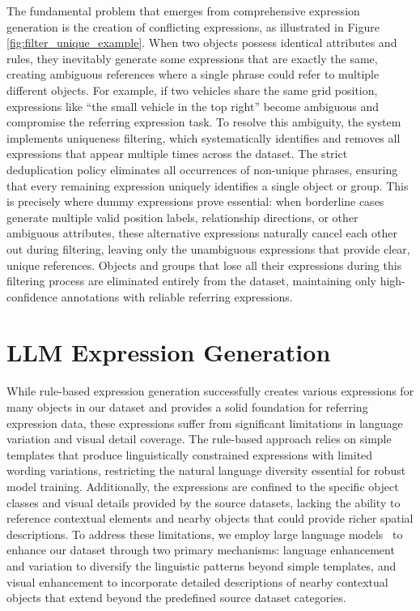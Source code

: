 The fundamental problem that emerges from comprehensive expression generation is the creation of conflicting expressions, as illustrated in Figure \ref{fig:filter_unique_example}. When two objects possess identical attributes and rules, they inevitably generate some expressions that are exactly the same, creating ambiguous references where a single phrase could refer to multiple different objects. For example, if two vehicles share the same grid position, expressions like ``the small vehicle in the top right'' become ambiguous and compromise the referring expression task. To resolve this ambiguity, the system implements uniqueness filtering, which systematically identifies and removes all expressions that appear multiple times across the dataset. The strict deduplication policy eliminates all occurrences of non-unique phrases, ensuring that every remaining expression uniquely identifies a single object or group. This is precisely where dummy expressions prove essential: when borderline cases generate multiple valid position labels, relationship directions, or other ambiguous attributes, these alternative expressions naturally cancel each other out during filtering, leaving only the unambiguous expressions that provide clear, unique references. Objects and groups that lose all their expressions during this filtering process are eliminated entirely from the dataset, maintaining only high-confidence annotations with reliable referring expressions.





\section{LLM Expression Generation}

While rule-based expression generation successfully creates various expressions for many objects in our dataset and provides a solid foundation for referring expression data, these expressions suffer from significant limitations in language variation and visual detail coverage. The rule-based approach relies on simple templates that produce linguistically constrained expressions with limited wording variations, restricting the natural language diversity essential for robust model training. Additionally, the expressions are confined to the specific object classes and visual details provided by the source datasets, lacking the ability to reference contextual elements and nearby objects that could provide richer spatial descriptions. To address these limitations, we employ large language models~\cite{gemma3,o3} to enhance our dataset through two primary mechanisms: language enhancement and variation to diversify the linguistic patterns beyond simple templates, and visual enhancement to incorporate detailed descriptions of nearby contextual objects that extend beyond the predefined source dataset categories.

